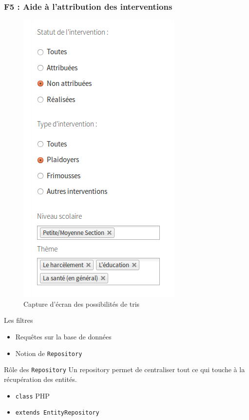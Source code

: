 \speaker{\Julie}

\begin{frame}
\frametitle{F5 : Aide à l'attribution des interventions}
	\begin{minipage}[c]{.40\linewidth}
      \begin{figure}[r]
		\includegraphics[scale=0.3]{images/filtreListeIntervention.png}
		\caption{Capture d'écran des possibilités de tris}
	  \end{figure}
   \end{minipage} \hfill
   \begin{minipage}[c]{.52\linewidth}
      \begin{block}{Les filtres}
		\begin{itemize}
			\item Requêtes sur la base de données
			\item Notion de \texttt{Repository}
		\end{itemize}
	  \end{block}
	  \begin{block}{Rôle des \texttt{Repository}}
		Un repository permet de centraliser tout ce qui touche à la récupération des entités.
		\begin{itemize}
		\item \texttt{class} PHP
		\item \texttt{extends EntityRepository}
		\end{itemize}
	  \end{block}
   \end{minipage} \hfill
\end{frame}

